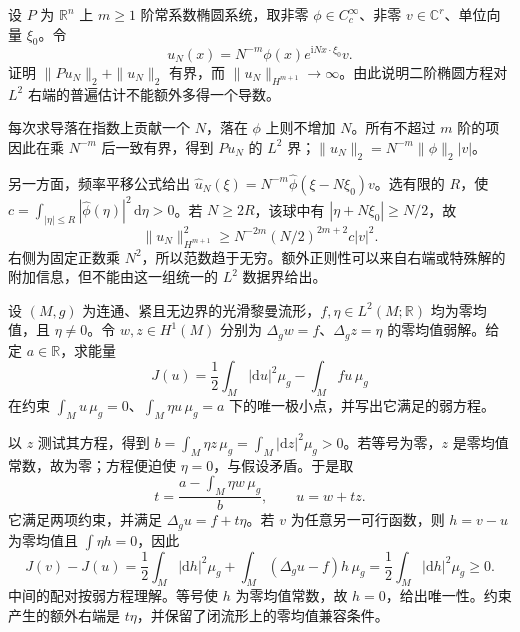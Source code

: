\begin{exercise}\label{g3:ex:elliptic-order-sharp}
	设 \(P\) 为 \(\mathbb R^n\) 上 \(m\ge1\) 阶常系数椭圆系统，取非零 \(\phi\in C_c^\infty\)、非零 \(v\in\mathbb C^r\)、单位向量 \(\xi_0\)。令
	\[
		u_N(x)=N^{-m}\phi(x)e^{\mathrm iNx\cdot\xi_0}v.
	\]
	证明 \(\|Pu_N\|_2+\|u_N\|_2\) 有界，而 \(\|u_N\|_{H^{m+1}}\to\infty\)。由此说明二阶椭圆方程对 \(L^2\) 右端的普遍估计不能额外多得一个导数。
\end{exercise}
\begin{solution}
	每次求导落在指数上贡献一个 \(N\)，落在 \(\phi\) 上则不增加 \(N\)。所有不超过 \(m\) 阶的项因此在乘 \(N^{-m}\) 后一致有界，得到 \(Pu_N\) 的 \(L^2\) 界；\(\|u_N\|_2=N^{-m}\|\phi\|_2|v|\)。

	另一方面，频率平移公式给出 \(\widehat u_N(\xi)=N^{-m}\widehat\phi(\xi-N\xi_0)v\)。选有限的 \(R\)，使 \(c=\int_{|\eta|\le R}|\widehat\phi(\eta)|^2\,\mathrm d\eta>0\)。若 \(N\ge2R\)，该球中有 \(|\eta+N\xi_0|\ge N/2\)，故
	\[
		\|u_N\|_{H^{m+1}}^2
		\ge N^{-2m}(N/2)^{2m+2}c|v|^2.
	\]
	右侧为固定正数乘 \(N^2\)，所以范数趋于无穷。额外正则性可以来自右端或特殊解的附加信息，但不能由这一组统一的 \(L^2\) 数据界给出。
\end{solution}

\begin{exercise}\label{g3:ex:poisson-linear-constraint}
	设 \((M,g)\) 为连通、紧且无边界的光滑黎曼流形，\(f,\eta\in L^2(M;\mathbb R)\) 均为零均值，且 \(\eta\ne0\)。令 \(w,z\in H^1(M)\) 分别为 \(\Delta_gw=f\)、\(\Delta_gz=\eta\) 的零均值弱解。给定 \(a\in\mathbb R\)，求能量
	\[
		J(u)=\frac12\int_M|\mathrm du|^2\mu_g-\int_Mfu\,\mu_g
	\]
	在约束 \(\int_Mu\,\mu_g=0\)、\(\int_M\eta u\,\mu_g=a\) 下的唯一极小点，并写出它满足的弱方程。
\end{exercise}
\begin{solution}
	以 \(z\) 测试其方程，得到
	\(b=\int_M\eta z\,\mu_g=\int_M|\mathrm dz|^2\mu_g>0\)。若等号为零，\(z\) 是零均值常数，故为零；方程便迫使 \(\eta=0\)，与假设矛盾。于是取
	\[
		t=\frac{a-\int_M\eta w\,\mu_g}{b},\qquad u=w+tz.
	\]
	它满足两项约束，并满足 \(\Delta_gu=f+t\eta\)。若 \(v\) 为任意另一可行函数，则 \(h=v-u\) 为零均值且 \(\int\eta h=0\)，因此
	\[
		J(v)-J(u)=\frac12\int_M|\mathrm dh|^2\mu_g
		+\int_M(\Delta_gu-f)h\,\mu_g
		=\frac12\int_M|\mathrm dh|^2\mu_g\ge0.
	\]
	中间的配对按弱方程理解。等号使 \(h\) 为零均值常数，故 \(h=0\)，给出唯一性。约束产生的额外右端是 \(t\eta\)，并保留了闭流形上的零均值兼容条件。
\end{solution}

